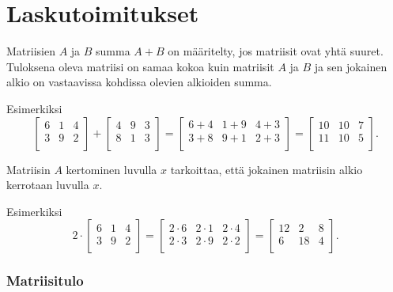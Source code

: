 \section{Laskutoimitukset}

Matriisien $A$ ja $B$ summa $A+B$ on määritelty,
jos matriisit ovat yhtä suuret.
Tuloksena oleva matriisi on
samaa kokoa kuin
matriisit $A$ ja $B$ ja sen jokainen
alkio on vastaavissa kohdissa
olevien alkioiden summa.

Esimerkiksi
\[
 \begin{bmatrix}
  6 & 1 & 4 \\
  3 & 9 & 2 \\
 \end{bmatrix}
+
 \begin{bmatrix}
  4 & 9 & 3 \\
  8 & 1 & 3 \\
 \end{bmatrix}
=
 \begin{bmatrix}
  6+4 & 1+9 & 4+3 \\
  3+8 & 9+1 & 2+3 \\
 \end{bmatrix}
=
 \begin{bmatrix}
  10 & 10 & 7 \\
  11 & 10 & 5 \\
 \end{bmatrix}.
\]

Matriisin $A$ kertominen luvulla $x$ tarkoittaa,
että jokainen matriisin alkio kerrotaan luvulla $x$.

Esimerkiksi
\[
 2 \cdot \begin{bmatrix}
  6 & 1 & 4 \\
  3 & 9 & 2 \\
 \end{bmatrix}
=
 \begin{bmatrix}
  2 \cdot 6 & 2\cdot1 & 2\cdot4 \\
  2\cdot3 & 2\cdot9 & 2\cdot2 \\
 \end{bmatrix}
=
 \begin{bmatrix}
  12 & 2 & 8 \\
  6 & 18 & 4 \\
 \end{bmatrix}.
\]

\subsubsection{Matriisitulo}

